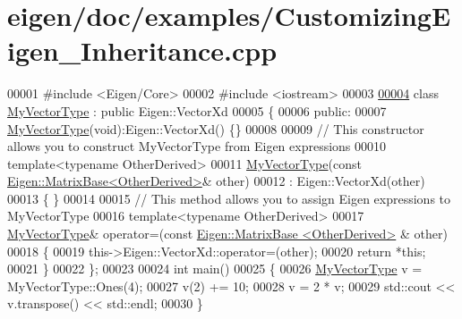 \hypertarget{eigen_2doc_2examples_2_customizing_eigen___inheritance_8cpp_source}{}\section{eigen/doc/examples/\+Customizing\+Eigen\+\_\+\+Inheritance.cpp}
\label{eigen_2doc_2examples_2_customizing_eigen___inheritance_8cpp_source}

\begin{DoxyCode}
00001 \textcolor{preprocessor}{#include <Eigen/Core>}
00002 \textcolor{preprocessor}{#include <iostream>}
00003 
\hyperlink{class_my_vector_type}{00004} \textcolor{keyword}{class }\hyperlink{class_my_vector_type}{MyVectorType} : \textcolor{keyword}{public} Eigen::VectorXd
00005 \{
00006 \textcolor{keyword}{public}:
00007     \hyperlink{class_my_vector_type}{MyVectorType}(\textcolor{keywordtype}{void}):Eigen::VectorXd() \{\}
00008 
00009     \textcolor{comment}{// This constructor allows you to construct MyVectorType from Eigen expressions}
00010     \textcolor{keyword}{template}<\textcolor{keyword}{typename} OtherDerived>
00011     \hyperlink{class_my_vector_type}{MyVectorType}(\textcolor{keyword}{const} \hyperlink{group___core___module_class_eigen_1_1_matrix_base}{Eigen::MatrixBase<OtherDerived>}& other)
00012         : Eigen::VectorXd(other)
00013     \{ \}
00014 
00015     \textcolor{comment}{// This method allows you to assign Eigen expressions to MyVectorType}
00016     \textcolor{keyword}{template}<\textcolor{keyword}{typename} OtherDerived>
00017     \hyperlink{class_my_vector_type}{MyVectorType}& operator=(\textcolor{keyword}{const} \hyperlink{group___core___module_class_eigen_1_1_matrix_base}{Eigen::MatrixBase <OtherDerived>}
      & other)
00018     \{
00019         this->Eigen::VectorXd::operator=(other);
00020         \textcolor{keywordflow}{return} *\textcolor{keyword}{this};
00021     \}
00022 \};
00023 
00024 \textcolor{keywordtype}{int} main()
00025 \{
00026   \hyperlink{class_my_vector_type}{MyVectorType} v = MyVectorType::Ones(4);
00027   v(2) += 10;
00028   v = 2 * v;
00029   std::cout << v.transpose() << std::endl;
00030 \}
\end{DoxyCode}

